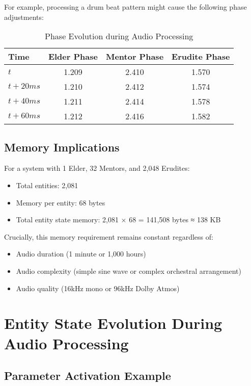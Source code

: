 For example, processing a drum beat pattern might cause the following phase adjustments:

\begin{table}[h]
\centering
\begin{tabular}{|l|c|c|c|}
\hline
\textbf{Time} & \textbf{Elder Phase} & \textbf{Mentor Phase} & \textbf{Erudite Phase} \\
\hline
$t$ & 1.209 & 2.410 & 1.570 \\
$t + 20ms$ & 1.210 & 2.412 & 1.574 \\
$t + 40ms$ & 1.211 & 2.414 & 1.578 \\
$t + 60ms$ & 1.212 & 2.416 & 1.582 \\
\hline
\end{tabular}
\caption{Phase Evolution during Audio Processing}
\end{table}

\subsection{Memory Implications}

For a system with 1 Elder, 32 Mentors, and 2,048 Erudites:
\begin{itemize}
    \item Total entities: 2,081
    \item Memory per entity: 68 bytes
    \item Total entity state memory: 2,081 × 68 = 141,508 bytes ≈ 138 KB
\end{itemize}

Crucially, this memory requirement remains constant regardless of:
\begin{itemize}
    \item Audio duration (1 minute or 1,000 hours)
    \item Audio complexity (simple sine wave or complex orchestral arrangement)
    \item Audio quality (16kHz mono or 96kHz Dolby Atmos)
\end{itemize}

\section{Entity State Evolution During Audio Processing}

\subsection{Parameter Activation Example}

